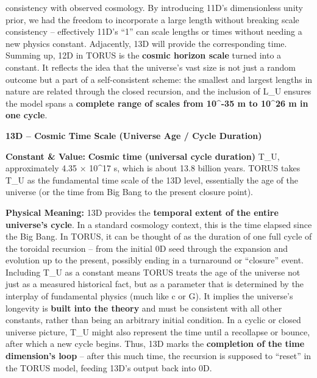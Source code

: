 \documentclass[
]{article}
\begin{document}
{consistency with observed cosmology\hspace{0pt}. By introducing 11D's
dimensionless unity prior, we had the freedom to incorporate a large
length without breaking scale consistency -- effectively 11D's ``1'' can
scale lengths or times without needing a new physics
constant\hspace{0pt}. Adjacently, 13D will provide the corresponding
time. Summing up, 12D in TORUS is the \textbf{cosmic horizon scale}
turned into a constant. It reflects the idea that the universe's vast
size is not just a random outcome but a part of a self-consistent
scheme: the smallest and largest lengths in nature are related through
the closed recursion, and the inclusion of L\_U ensures the model spans
a \textbf{complete range of scales from 10\^{}-35 m to 10\^{}26 m in one
cycle}.

\textbf{13D -- Cosmic Time Scale (Universe Age / Cycle Duration)}

\textbf{Constant \& Value:} \textbf{Cosmic time (universal cycle
duration)} T\_U, approximately 4.35 × 10\^{}17 s\hspace{0pt}, which is
about 13.8 billion years. TORUS takes T\_U as the fundamental time scale
of the 13D level, essentially the age of the universe (or the time from
Big Bang to the present closure point).

\textbf{Physical Meaning:} 13D provides the \textbf{temporal extent of
the entire universe's cycle}. In a standard cosmology context, this is
the time elapsed since the Big Bang. In TORUS, it can be thought of as
the duration of one full cycle of the toroidal recursion -- from the
initial 0D seed through the expansion and evolution up to the present,
possibly ending in a turnaround or ``closure'' event\hspace{0pt}.
Including T\_U as a constant means TORUS treats the age of the universe
not just as a measured historical fact, but as a parameter that is
determined by the interplay of fundamental physics (much like c or G).
It implies the universe's longevity is \textbf{built into the theory}
and must be consistent with all other constants, rather than being an
arbitrary initial condition\hspace{0pt}. In a cyclic or closed universe
picture, T\_U might also represent the time until a recollapse or
bounce, after which a new cycle begins. Thus, 13D marks the
\textbf{completion of the time dimension's loop} -- after this much
time, the recursion is supposed to ``reset'' in the TORUS model, feeding
13D's output back into 0D.

}
\end{document}
